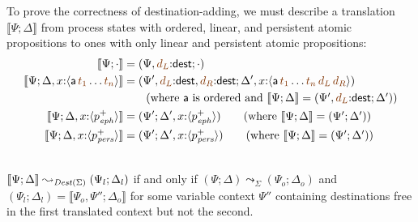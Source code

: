 

To prove the correctness of destination-adding, we must describe a 
translation $\llbracket \Psi; \Delta \rrbracket$ from process states
with ordered, linear, and persistent atomic propositions to ones
with only linear and persistent atomic propositions:
\begin{align*}
\llbracket \Psi; \cdot \rrbracket & = (\Psi, \lf{d_L}{:}{\sf dest}; \cdot) 
\\
\llbracket \Psi; \Delta, x{:}\susp{{\sf a}\,\lf{t_1}\ldots \lf{t_n}} \rrbracket 
& = (\Psi', \lf{d_L}{:}{\sf dest}, \lf{d_R}{:}{\sf dest}; 
     \Delta', x{:}\susp{{\sf a}\,\lf{t_1}\ldots \lf{t_n}\,\lf{d_L}\,\lf{d_R}})\\
& \qquad
  \mbox{(where $\sf a$ is ordered and
  $\llbracket \Psi; \Delta \rrbracket = (\Psi', \lf{d_L}{:}{\sf dest}; \Delta') $)}
\\
\llbracket \Psi; \Delta, x{:}\susp{p^+_\meph} \rrbracket 
& = (\Psi'; \Delta', x{:}\susp{p^+_\meph})
 \qquad \mbox{(where
       $\llbracket \Psi; \Delta \rrbracket = (\Psi'; \Delta') $)}
\\
\llbracket \Psi; \Delta, x{:}\susp{p^+_\mpers} \rrbracket 
& = (\Psi'; \Delta', x{:}\susp{p^+_\mpers})
  \qquad \mbox{(where 
       $\llbracket \Psi; \Delta \rrbracket = (\Psi'; \Delta') $)}
\end{align*}

\begin{theorem}~\\\label{thm:destcorrect}
$\llbracket \Psi; \Delta \rrbracket \leadsto_{{\it Dest}(\Sigma)}
 (\Psi_l; \Delta_l)$ if and only if 
$(\Psi; \Delta) \leadsto_\Sigma (\Psi_o; \Delta_o)$ and
$(\Psi_l; \Delta_l) = \llbracket \Psi_o, \Psi''; \Delta_o \rrbracket$ 
for some variable 
context $\Psi''$ containing destinations free in the first translated
context but not the second.
\end{theorem}

